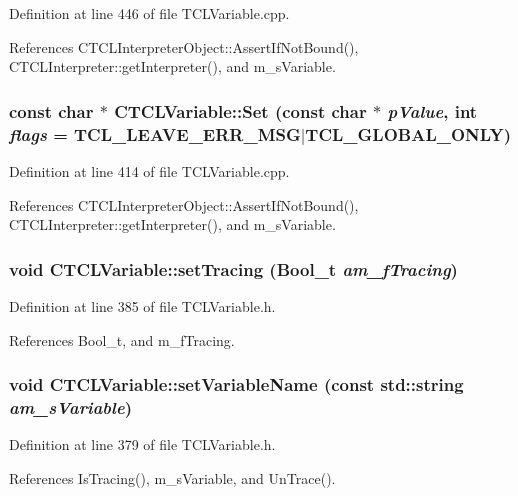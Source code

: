 Definition at line 446 of file TCLVariable.cpp.

References CTCLInterpreter\-Object::Assert\-If\-Not\-Bound(), CTCLInterpreter::get\-Interpreter(), and m\_\-s\-Variable.
\subsubsection{\setlength{\rightskip}{0pt plus 5cm}const char $\ast$ CTCLVariable::Set (const char $\ast$ {\em p\-Value}, int {\em flags} = TCL\_\-LEAVE\_\-ERR\_\-MSG$|$TCL\_\-GLOBAL\_\-ONLY)\hspace{0.3cm}{\tt  [virtual]}}\label{classCTCLVariable_a10}




Definition at line 414 of file TCLVariable.cpp.

References CTCLInterpreter\-Object::Assert\-If\-Not\-Bound(), CTCLInterpreter::get\-Interpreter(), and m\_\-s\-Variable.
\subsubsection{\setlength{\rightskip}{0pt plus 5cm}void CTCLVariable::set\-Tracing ({\bf Bool\_\-t} {\em am\_\-f\-Tracing})\hspace{0.3cm}{\tt  [inline, protected]}}\label{classCTCLVariable_b0}




Definition at line 385 of file TCLVariable.h.

References Bool\_\-t, and m\_\-f\-Tracing.
\subsubsection{\setlength{\rightskip}{0pt plus 5cm}void CTCLVariable::set\-Variable\-Name (const std::string {\em am\_\-s\-Variable})\hspace{0.3cm}{\tt  [inline]}}\label{classCTCLVariable_a8}




Definition at line 379 of file TCLVariable.h.

References Is\-Tracing(), m\_\-s\-Variable, and Un\-Trace().
